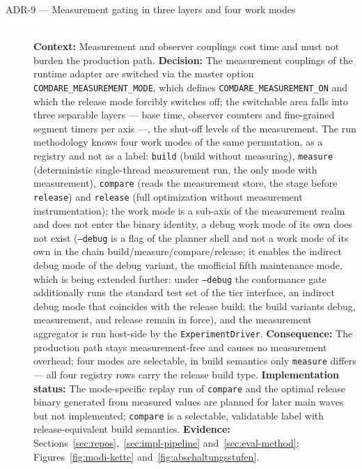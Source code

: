 \begin{description}
  \item[ADR-9 --- Measurement gating in three layers and four work modes]\hfill\\
  \textbf{Context:} Measurement and observer couplings cost time and must not burden the
  production path.
  \textbf{Decision:} The measurement couplings of the runtime adapter are switched via the master
  option \texttt{COMDARE\_MEASUREMENT\_MODE}, which defines \texttt{COMDARE\_MEASUREMENT\_ON} and
  which the release mode forcibly switches off; the switchable area falls into three separable
  layers --- base time, observer counters and fine-grained segment timers per axis ---, the
  shut-off levels of the measurement. The run methodology knows four work modes of the same
  permutation, as a registry and not as a label: \texttt{build} (build without measuring),
  \texttt{measure} (deterministic single-thread measurement run, the only mode with measurement),
  \texttt{compare} (reads the measurement store, the stage before \texttt{release}) and
  \texttt{release} (full optimization without measurement instrumentation); the work mode is a
  sub-axis of the measurement realm and does not enter the binary identity, a debug work mode of its own does not exist (\texttt{--debug} is a flag of the planner shell and not a work mode
  of its own in the chain build/measure/compare/release; it enables the indirect debug mode of the debug variant,
  the unofficial fifth maintenance mode, which is being extended further: under \texttt{--debug} the conformance
  gate additionally runs the standard test set of the tier interface, an indirect debug mode that coincides with
  the release build; the build variants debug, measurement, and release remain in force),
  and the measurement aggregator is run host-side by the \texttt{ExperimentDriver}.
  \textbf{Consequence:} The production path stays measurement-free and causes no measurement
  overhead; four modes are selectable, in build semantics only \texttt{measure} differs --- all
  four registry rows carry the release build type.
  \textbf{Implementation status:} The mode-specific replay run of \texttt{compare} and the optimal
  release binary generated from measured values are planned for later main waves but not
  implemented;
  \texttt{compare} is a selectable, validatable label with release-equivalent build semantics.
  \textbf{Evidence:} Sections~\ref{sec:repos},~\ref{sec:impl-pipeline} and~\ref{sec:eval-method};
  Figures~\ref{fig:modi-kette} and~\ref{fig:abschaltungsstufen}.


\end{description}
